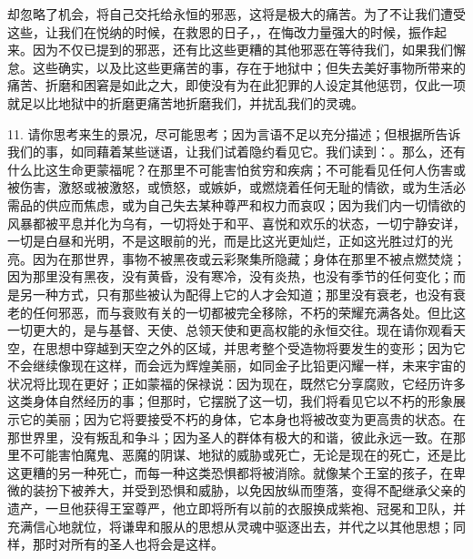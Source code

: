 却忽略了机会，将自己交托给永恒的邪恶，这将是极大的痛苦。为了不让我们遭受这些，让我们在悦纳的时候，在救恩的日子，，在悔改力量强大的时候，振作起来。因为不仅已提到的邪恶，还有比这些更糟的其他邪恶在等待我们，如果我们懈怠。这些确实，以及比这些更痛苦的事，存在于地狱中；但失去美好事物所带来的痛苦、折磨和困窘是如此之大，即使没有为在此犯罪的人设定其他惩罚，仅此一项就足以比地狱中的折磨更痛苦地折磨我们，并扰乱我们的灵魂。\par

11. 请你思考来生的景况，尽可能思考；因为言语不足以充分描述；但根据所告诉我们的事，如同藉着某些谜语，让我们试着隐约看见它。我们读到：。那么，还有什么比这生命更蒙福呢？在那里不可能害怕贫穷和疾病；不可能看见任何人伤害或被伤害，激怒或被激怒，或愤怒，或嫉妒，或燃烧着任何无耻的情欲，或为生活必需品的供应而焦虑，或为自己失去某种尊严和权力而哀叹；因为我们内一切情欲的风暴都被平息并化为乌有，一切将处于和平、喜悦和欢乐的状态，一切宁静安详，一切是白昼和光明，不是这眼前的光，而是比这光更灿烂，正如这光胜过灯的光亮。因为在那世界，事物不被黑夜或云彩聚集所隐藏；身体在那里不被点燃焚烧；因为那里没有黑夜，没有黄昏，没有寒冷，没有炎热，也没有季节的任何变化；而是另一种方式，只有那些被认为配得上它的人才会知道；那里没有衰老，也没有衰老的任何邪恶，而与衰败有关的一切都被完全移除，不朽的荣耀充满各处。但比这一切更大的，是与基督、天使、总领天使和更高权能的永恒交往。现在请你观看天空，在思想中穿越到天空之外的区域，并思考整个受造物将要发生的变形；因为它不会继续像现在这样，而会远为辉煌美丽，如同金子比铅更闪耀一样，未来宇宙的状况将比现在更好；正如蒙福的保禄说：因为现在，既然它分享腐败，它经历许多这类身体自然经历的事；但那时，它摆脱了这一切，我们将看见它以不朽的形象展示它的美丽；因为它将要接受不朽的身体，它本身也将被改变为更高贵的状态。在那世界里，没有叛乱和争斗；因为圣人的群体有极大的和谐，彼此永远一致。在那里不可能害怕魔鬼、恶魔的阴谋、地狱的威胁或死亡，无论是现在的死亡，还是比这更糟的另一种死亡，而每一种这类恐惧都将被消除。就像某个王室的孩子，在卑微的装扮下被养大，并受到恐惧和威胁，以免因放纵而堕落，变得不配继承父亲的遗产，一旦他获得王室尊严，他立即将所有以前的衣服换成紫袍、冠冕和卫队，并充满信心地就位，将谦卑和服从的思想从灵魂中驱逐出去，并代之以其他思想；同样，那时对所有的圣人也将会是这样。\par

